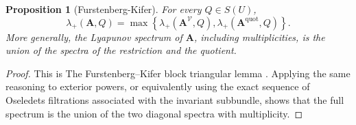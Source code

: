 \documentclass[11pt,a4paper]{amsart}
\newtheorem{proposition}[theorem]{Proposition}
\newcommand{\norm}[1]{\left\lVert #1\right\rVert}
\begin{document}
\begin{proposition}[Furstenberg-Kifer]\label{prop:block-formula}
For every \(Q\in S(U)\),
\[
 \lambda_+(\mathbf A,Q)
 =\max\left\{
 \lambda_+(\mathbf A^{\boldsymbol{\mathcal V}},Q),
 \lambda_+(\mathbf A^{\mathrm{quot}},Q)
 \right\}.
\]
More generally, the Lyapunov spectrum of \(\mathbf A\), including
multiplicities, is the union of the spectra of the restriction and
the quotient.
\end{proposition}

\begin{proof}
%

This is The Furstenberg--Kifer block triangular lemma
\cite[Lemma~III.3.3]{Kifer}.  Applying the same reasoning to exterior
powers, or equivalently using the exact sequence of Oseledets
filtrations associated with the invariant subbundle, shows that the
full spectrum is the union of the two diagonal spectra with
multiplicity.
\end{proof}
\end{document}
